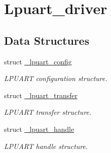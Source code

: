 \hypertarget{group__lpuart__driver}{}\section{Lpuart\+\_\+driver}
\label{group__lpuart__driver}
\subsection*{Data Structures}
\begin{DoxyCompactItemize}
\item 
struct \mbox{\hyperlink{struct__lpuart__config}{\+\_\+lpuart\+\_\+config}}
\begin{DoxyCompactList}\small\item\em L\+P\+U\+A\+RT configuration structure. \end{DoxyCompactList}\item 
struct \mbox{\hyperlink{struct__lpuart__transfer}{\+\_\+lpuart\+\_\+transfer}}
\begin{DoxyCompactList}\small\item\em L\+P\+U\+A\+RT transfer structure. \end{DoxyCompactList}\item 
struct \mbox{\hyperlink{struct__lpuart__handle}{\+\_\+lpuart\+\_\+handle}}
\begin{DoxyCompactList}\small\item\em L\+P\+U\+A\+RT handle structure. \end{DoxyCompactList}\end{DoxyCompactItemize}

